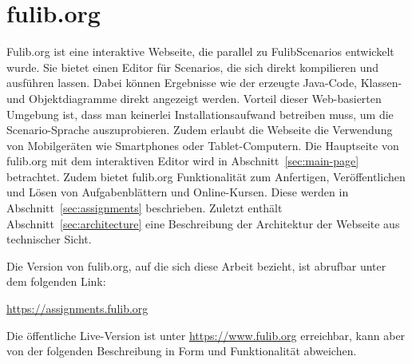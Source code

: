 \chapter{fulib.org}\label{ch:fulib.org}

Fulib.org ist eine interaktive Webseite, die parallel zu FulibScenarios entwickelt wurde.
Sie bietet einen Editor für Scenarios, die sich direkt kompilieren und ausführen lassen.
Dabei können Ergebnisse wie der erzeugte Java-Code, Klassen- und Objektdiagramme direkt angezeigt werden.
Vorteil dieser Web-basierten Umgebung ist, dass man keinerlei Installationsaufwand betreiben muss, um die Scenario-Sprache auszuprobieren.
Zudem erlaubt die Webseite die Verwendung von Mobilgeräten wie Smartphones oder Tablet-Computern.
Die Hauptseite von fulib.org mit dem interaktiven Editor wird in Abschnitt~\ref{sec:main-page} betrachtet.
Zudem bietet fulib.org Funktionalität zum Anfertigen, Veröffentlichen und Lösen von Aufgabenblättern und Online-Kursen.
Diese werden in Abschnitt~\ref{sec:assignments} beschrieben.
Zuletzt enthält Abschnitt~\ref{sec:architecture} eine Beschreibung der Architektur der Webseite aus technischer Sicht.

Die Version von fulib.org, auf die sich diese Arbeit bezieht, ist abrufbar unter dem folgenden Link:

\begin{center}
    \url{https://assignments.fulib.org}
\end{center}

Die öffentliche Live-Version ist unter \url{https://www.fulib.org} erreichbar, kann aber von der folgenden Beschreibung in Form und Funktionalität abweichen.




